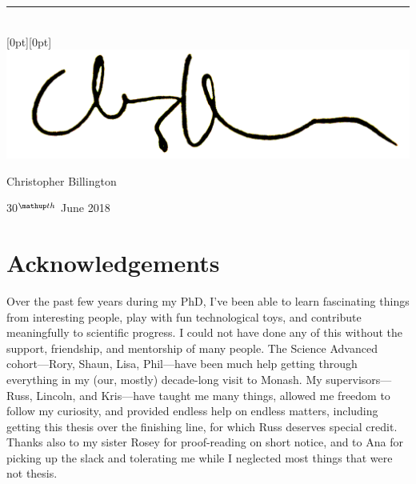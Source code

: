 \begin{center}
\vspace{1.5cm}
\rule{8cm}{1pt}\\
\raisebox{0.5cm}[0pt][0pt]{\includegraphics[scale=0.1]{submission/cjb}}

\vspace{0.5\baselineskip}

Christopher Billington

\vspace{0.5\baselineskip}

30$^\up{th}$ June 2018




\end{center}

\chapter*{Acknowledgements}

Over the past few years during my PhD, I've been able to learn fascinating things from interesting people, play with fun technological toys, and contribute meaningfully to scientific progress. I could not have done any of this without the support, friendship, and mentorship of many people. The Science Advanced cohort---Rory, Shaun, Lisa, Phil---have been much help getting through everything in my (our, mostly) decade-long visit to Monash. My supervisors---Russ, Lincoln, and Kris---have taught me many things, allowed me freedom to follow my curiosity, and provided endless help on endless matters, including getting this thesis over the finishing line, for which Russ deserves special credit. Thanks also to my sister Rosey for proof-reading on short notice, and to Ana for picking up the slack and tolerating me while I neglected most things that were not thesis.

